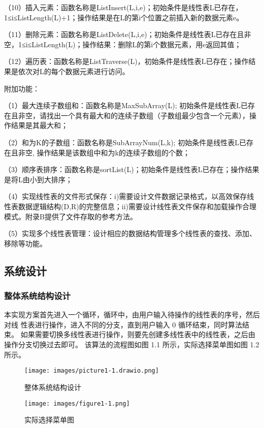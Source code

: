 \documentclass[supercite]{Experimental_Report}
\theoremstyle{definition}
\begin{document}
（10）插入元素：函数名称是ListInsert(L,i,e)；初始条件是线性表L已存在，1≤i≤ListLength(L)+1；操作结果是在L的第i个位置之前插入新的数据元素e。

（11）删除元素：函数名称是ListDelete(L,i,e)；初始条件是线性表L已存在且非空，1≤i≤ListLength(L)；操作结果：删除L的第i个数据元素，用e返回其值；

（12）遍历表：函数名称是ListTraverse(L)，初始条件是线性表L已存在；操作结果是依次对L的每个数据元素进行访问。

附加功能：

（1）最大连续子数组和：函数名称是MaxSubArray(L); 初始条件是线性表L已存在且非空，请找出一个具有最大和的连续子数组（子数组最少包含一个元素），操作结果是其最大和；

（2）和为K的子数组：函数名称是SubArrayNum(L,k); 初始条件是线性表L已存在且非空, 操作结果是该数组中和为k的连续子数组的个数；

（3）顺序表排序：函数名称是sortList(L)；初始条件是线性表L已存在；操作结果是将L由小到大排序；

（4）实现线性表的文件形式保存：i)需要设计文件数据记录格式，以高效保存线性表数据逻辑结构(D,{R})的完整信息；ii)需要设计线性表文件保存和加载操作合理模式。附录B提供了文件存取的参考方法。

（5）实现多个线性表管理：设计相应的数据结构管理多个线性表的查找、添加、移除等功能。


\subsection{系统设计}
\subsubsection{整体系统结构设计}
本实现方案首先进入一个循环，循环中，由用户输入待操作的线性表的序号，然后对线
性表进行操作，进入不同的分支，直到用户输入 0 循环结束，同时算法结束。
如果需要切换多线性表进行操作，则要先创建多线性表中的线性表，之后由操作分支切换过去即可。
该算法的流程图如图 1.1 所示，实际选择菜单图如图 1.2 所示。
\begin{figure}[H] %
	\begin{center}
		\texttt{[image: images/picture1-1.drawio.png]}
		\vspace{0.6cm}
		\caption{整体系统结构设计}
		\label{fig1-1}
	\end{center}
\end{figure}

\begin{figure}[H]
	\begin{center}
		\texttt{[image: images/figure1-1.png]}
		\vspace{0.6cm}
		\caption{实际选择菜单图}
		\label{fig1-5}
	\end{center}
\end{figure}
\end{document}
